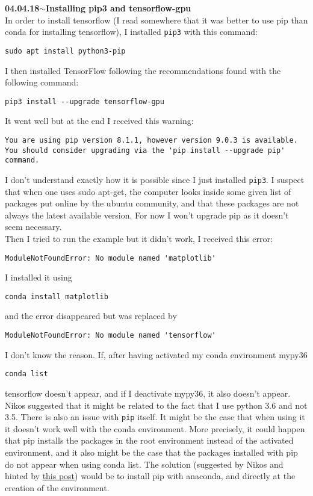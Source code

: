 \documentclass[11pt,a4paper]{article}
\newenvironment{loggentry}[2]%
{\noindent\textbf{#1}\hspace{1cm}$\mathbf{\sim}$\text{ }\textbf{#2}\\}{\vspace{0.5cm}}
\begin{document}
\begin{loggentry}{04.04.18}{Installing pip3 and tensorflow-gpu}
In order to install tensorflow (I read somewhere that it was better to use pip than conda for installing tensorflow), I installed \texttt{pip3} with this command:\\
\begin{verbatim}
sudo apt install python3-pip
\end{verbatim}
I then installed TensorFlow following the recommendations found  with the following command:\\
\begin{verbatim}
pip3 install --upgrade tensorflow-gpu
\end{verbatim}
It went well but at the end I received this warning:
\begin{verbatim}
You are using pip version 8.1.1, however version 9.0.3 is available.
You should consider upgrading via the 'pip install --upgrade pip' command.
\end{verbatim}
I don't understand exactly how it is possible since I just installed \texttt{pip3}. I suspect that when one uses sudo apt-get, the computer looks inside some given list of packages put online by the ubuntu community, and that these packages are not always the latest available version. For now I won't upgrade pip as it doesn't seem necessary.\\
Then I tried to run the example but it didn't work, I received this error:\\
\begin{verbatim}
ModuleNotFoundError: No module named 'matplotlib'
\end{verbatim}
I installed it using
\begin{verbatim}
conda install matplotlib
\end{verbatim}
and the error disappeared but was replaced by 
\begin{verbatim}
ModuleNotFoundError: No module named 'tensorflow'
\end{verbatim}
I don't know the reason. If, after having activated my conda environment mypy36\\
\begin{verbatim}
conda list
\end{verbatim}
tensorflow doesn't appear, and if I deactivate mypy36, it also doesn't appear. Nikos suggested that it might be related to the fact that I use python 3.6 and not 3.5. There is also an issue with \texttt{pip} itself. It might be the case that when using it it doesn't work well with the conda environment. More precisely, it could happen that pip installs the packages in the root environment instead of the activated environment, and it also might be the case that the packages installed with pip do not appear when using conda list. The solution (suggested by Nikos and hinted by \href{https://stackoverflow.com/questions/18640305/how-do-i-keep-track-of-pip-installed-packages-in-an-anaconda-conda-environment}{this post}) would be to install pip with anaconda, and directly at the creation of the environment.\\

\end{loggentry}
\end{document}
